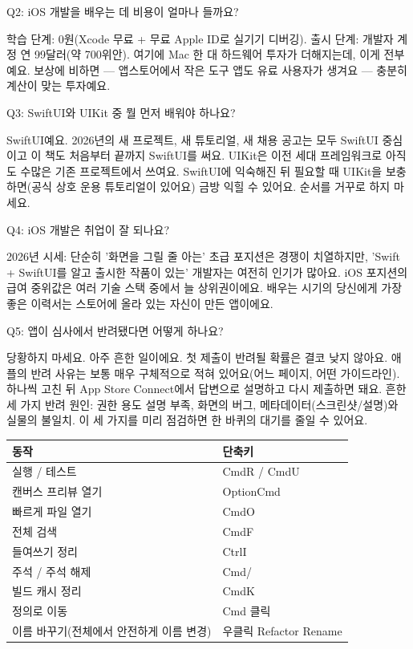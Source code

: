 Q2: iOS 개발을 배우는 데 비용이 얼마나 들까요?

학습 단계: 0원(Xcode 무료 + 무료 Apple ID로 실기기 디버깅). 출시 단계: 개발자 계정 연 99달러(약 700위안). 여기에 Mac 한 대 하드웨어 투자가 더해지는데, 이게 전부예요. 보상에 비하면 — 앱스토어에서 작은 도구 앱도 유료 사용자가 생겨요 — 충분히 계산이 맞는 투자예요.

Q3: SwiftUI와 UIKit 중 뭘 먼저 배워야 하나요?

SwiftUI예요. 2026년의 새 프로젝트, 새 튜토리얼, 새 채용 공고는 모두 SwiftUI 중심이고 이 책도 처음부터 끝까지 SwiftUI를 써요. UIKit은 이전 세대 프레임워크로 아직도 수많은 기존 프로젝트에서 쓰여요. SwiftUI에 익숙해진 뒤 필요할 때 UIKit을 보충하면(공식 상호 운용 튜토리얼이 있어요) 금방 익힐 수 있어요. 순서를 거꾸로 하지 마세요.

Q4: iOS 개발은 취업이 잘 되나요?

2026년 시세: 단순히 '화면을 그릴 줄 아는' 초급 포지션은 경쟁이 치열하지만, 'Swift + SwiftUI를 알고 출시한 작품이 있는' 개발자는 여전히 인기가 많아요. iOS 포지션의 급여 중위값은 여러 기술 스택 중에서 늘 상위권이에요. 배우는 시기의 당신에게 가장 좋은 이력서는 스토어에 올라 있는 자신이 만든 앱이에요.

Q5: 앱이 심사에서 반려됐다면 어떻게 하나요?

당황하지 마세요. 아주 흔한 일이에요. 첫 제출이 반려될 확률은 결코 낮지 않아요. 애플의 반려 사유는 보통 매우 구체적으로 적혀 있어요(어느 페이지, 어떤 가이드라인). 하나씩 고친 뒤 App Store Connect에서 답변으로 설명하고 다시 제출하면 돼요. 흔한 세 가지 반려 원인: 권한 용도 설명 부족, 화면의 버그, 메타데이터(스크린샷/설명)와 실물의 불일치. 이 세 가지를 미리 점검하면 한 바퀴의 대기를 줄일 수 있어요.


\begin{center}
\begin{tabularx}{\linewidth}{|X|X|}
\hline
\textbf{동작} & \textbf{단축키} \tabularnewline
\hline
실행 / 테스트 & CmdR / CmdU \tabularnewline
캔버스 프리뷰 열기 & OptionCmd \tabularnewline
빠르게 파일 열기 & CmdO \tabularnewline
전체 검색 & CmdF \tabularnewline
들여쓰기 정리 & CtrlI \tabularnewline
주석 / 주석 해제 & Cmd/ \tabularnewline
빌드 캐시 정리 & CmdK \tabularnewline
정의로 이동 & Cmd 클릭 \tabularnewline
이름 바꾸기(전체에서 안전하게 이름 변경) & 우클릭 Refactor Rename \tabularnewline
\hline
\end{tabularx}
\end{center}

